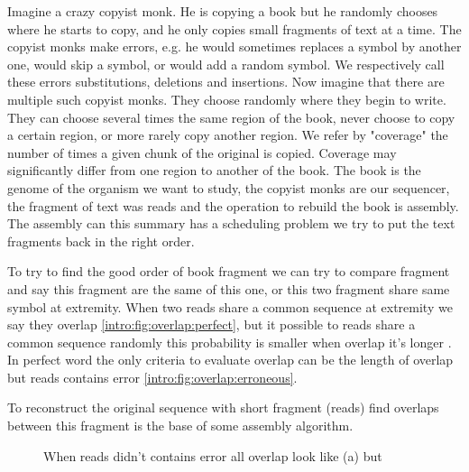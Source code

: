 \documentclass[./main.tex]{subfiles}
\begin{document}
Imagine a crazy copyist monk. He is copying a book but he randomly chooses where he starts to copy, and he only copies small fragments of text at a time.
The copyist monks make errors, e.g. he would sometimes replaces a symbol by another one, would skip a symbol, or would add a random symbol. We respectively call these errors substitutions, deletions and insertions.
Now imagine that there are multiple such copyist monks.
They choose randomly where they begin to write. They can choose several times the same region of the book, never choose to copy a certain region, or more rarely copy another region. We refer by "coverage" the number of times a given chunk of the original is copied. Coverage may significantly differ from one region to another of the book.
The book is the genome of the organism we want to study, the copyist monks are our sequencer, the fragment of text was reads and the operation to rebuild the book is assembly. The assembly can this summary has a scheduling problem we try to put the text fragments back in the right order.

To try to find the good order of book fragment we can try to compare fragment and say this fragment are the same of this one, or this two fragment share same symbol at extremity. When two reads share a common sequence at extremity we say they overlap \ref{intro:fig:overlap:perfect}, but it possible to reads share a common sequence randomly this probability is smaller when overlap it's longer . In perfect word the only criteria to evaluate overlap can be the length of overlap but reads contains error \ref{intro:fig:overlap:erroneous}.

To reconstruct the original sequence with short fragment (reads) find overlaps between this fragment is the base of some assembly algorithm.

\begin{figure}[ht]
    \centering
    \caption{When reads didn't contains error all overlap look like (a) but}
    \label{intro:fig:overlap}
\end{figure}
\end{document}
